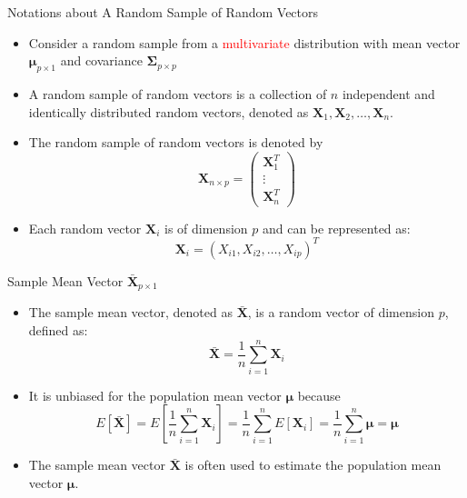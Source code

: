 \documentclass[
  ignorenonframetext,
]{beamer}
\providecommand{\tightlist}{%
  \setlength{\itemsep}{0pt}\setlength{\parskip}{0pt}}
\begin{document}
\begin{frame}{Notations about A Random Sample of Random Vectors}
\protect\hypertarget{notations-about-a-random-sample-of-random-vectors}{}
\begin{itemize}
\item
  Consider a random sample from a \textcolor{red}{multivariate}
  distribution with mean vector \(\boldsymbol \mu_{p\times 1}\) and
  covariance \(\boldsymbol \Sigma_{p\times p}\)
\item
  A random sample of random vectors is a collection of \(n\) independent
  and identically distributed random vectors, denoted as
  \(\mathbf{X}_1, \mathbf{X}_2, \dots, \mathbf{X}_n\).
\item
  The random sample of random vectors is denoted by
  \[\mathbf X_{n\times p} = \begin{pmatrix}\mathbf X_1^T \\ \vdots \\ \mathbf X_n^T\end{pmatrix}\]
\item
  Each random vector \(\mathbf{X}_i\) is of dimension \(p\) and can be
  represented as: \[
  \mathbf{X}_i = (X_{i1}, X_{i2}, \dots, X_{ip})^T
  \]
\end{itemize}
\end{frame}

\begin{frame}{Sample Mean Vector \(\bar{\mathbf{X}}_{p\times 1}\)}
\protect\hypertarget{sample-mean-vector-barmathbfx_ptimes-1}{}
\begin{itemize}
\tightlist
\item
  The sample mean vector, denoted as \(\bar{\mathbf{X}}\), is a random
  vector of dimension \(p\), defined as: \[
  \bar{\mathbf{X}} = \frac{1}{n}\sum_{i=1}^n \mathbf{X}_i
  \]
\item
  It is unbiased for the population mean vector \(\boldsymbol \mu\)
  because
  \[E[\bar{\mathbf{X}}] = E[\frac{1}{n}\sum_{i=1}^n \mathbf{X}_i]= \frac{1}{n}\sum_{i=1}^n E[\mathbf{X}_i] =\frac{1}{n}\sum_{i=1}^n \boldsymbol \mu =\boldsymbol \mu\]
\item
  The sample mean vector \(\bar{\mathbf{X}}\) is often used to estimate
  the population mean vector \(\boldsymbol \mu\).
\end{itemize}
\end{frame}
\end{document}
